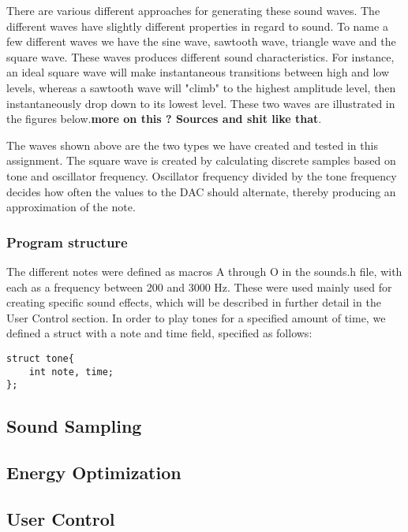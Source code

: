 There are various different approaches for generating these sound waves. The different waves have slightly different properties in regard to sound. To name a few different waves we have the sine wave, sawtooth wave, triangle wave and the square wave. These waves produces different sound characteristics. For instance, an ideal square wave will make instantaneous transitions between high and low levels, whereas a sawtooth wave will "climb" to the highest amplitude level, then instantaneously drop down to its lowest level. These two waves are illustrated in the figures below.{\bf more on this ? Sources and shit like that}. 




The waves shown above are the two types we have created and tested in this assignment. The square wave is created by calculating discrete samples based on tone and oscillator frequency. Oscillator frequency divided by the tone frequency decides how often the values to the DAC should alternate, thereby producing an approximation of the note. 

\subsubsection{Program structure}

The different notes were defined as macros A through O in the sounds.h file, with each as a frequency between 200 and 3000 Hz. These were used mainly used for creating specific sound effects, which will be described in further detail in the User Control section.
	In order to play tones for a specified amount of time, we defined a struct with a note and time field, specified as follows:
	
\begin{lstlisting}
struct tone{
	int note, time;
};
\end{lstlisting}



\subsection{Sound Sampling}





\subsection{Energy Optimization}




\subsection{User Control}












